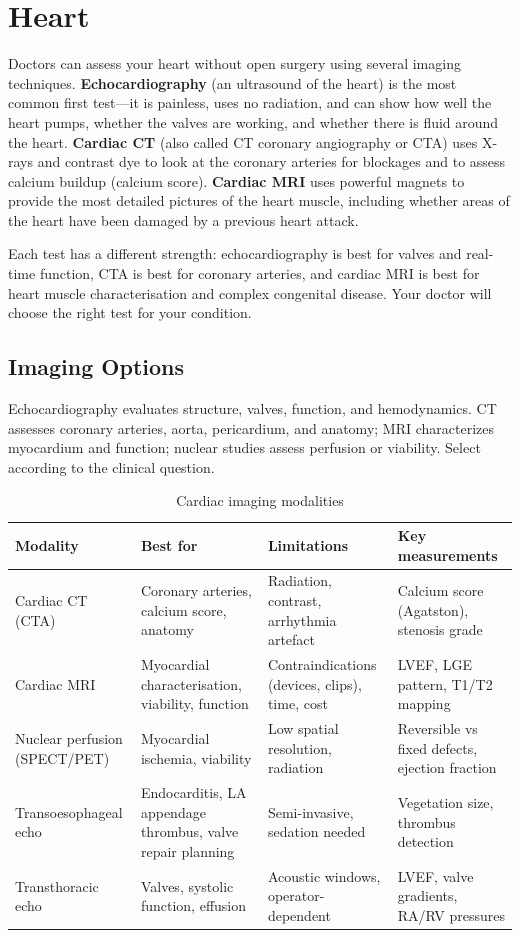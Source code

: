 \chapter{Heart}

\label{ch:ch42_heart}

Doctors can assess your heart without open surgery using several imaging techniques. \textbf{Echocardiography} (an ultrasound of the heart) is the most common first test---it is painless, uses no radiation, and can show how well the heart pumps, whether the valves are working, and whether there is fluid around the heart. \textbf{Cardiac CT} (also called CT coronary angiography or CTA) uses X-rays and contrast dye to look at the coronary arteries for blockages and to assess calcium buildup (calcium score). \textbf{Cardiac MRI} uses powerful magnets to provide the most detailed pictures of the heart muscle, including whether areas of the heart have been damaged by a previous heart attack.

Each test has a different strength: echocardiography is best for valves and real-time function, CTA is best for coronary arteries, and cardiac MRI is best for heart muscle characterisation and complex congenital disease. Your doctor will choose the right test for your condition.


\section{Imaging Options}
Echocardiography evaluates structure, valves, function, and hemodynamics. CT assesses coronary arteries, aorta, pericardium, and anatomy; MRI characterizes myocardium and function; nuclear studies assess perfusion or viability. Select according to the clinical question.

\begin{table}[h]
\centering
\caption{Cardiac imaging modalities}
\begin{tabular}{p{2.8cm} p{3.5cm} p{3.5cm} p{3.5cm}}
\hline
\textbf{Modality} & \textbf{Best for} & \textbf{Limitations} & \textbf{Key measurements} \\
\hline
Cardiac CT (CTA) & Coronary arteries, calcium score, anatomy & Radiation, contrast, arrhythmia artefact & Calcium score (Agatston), stenosis grade \\
Cardiac MRI & Myocardial characterisation, viability, function & Contraindications (devices, clips), time, cost & LVEF, LGE pattern, T1/T2 mapping \\
Nuclear perfusion (SPECT/PET) & Myocardial ischemia, viability & Low spatial resolution, radiation & Reversible vs fixed defects, ejection fraction \\
Transoesophageal echo & Endocarditis, LA appendage thrombus, valve repair planning & Semi-invasive, sedation needed & Vegetation size, thrombus detection \\
Transthoracic echo & Valves, systolic function, effusion & Acoustic windows, operator-dependent & LVEF, valve gradients, RA/RV pressures \\
\hline
\end{tabular}
\end{table}

